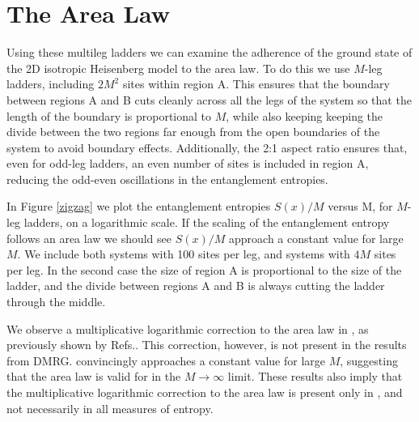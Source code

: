 \section{The Area Law}

Using these multileg ladders we can examine the adherence of the ground state of the 2D isotropic Heisenberg model to the area law.
To do this we use $M$-leg ladders, including $2M^2$ sites within region A.  
This ensures that the boundary between regions A and B cuts cleanly across all the legs of the system so that the length of the boundary is proportional to $M$, while also keeping keeping the divide between the two regions far enough from the open boundaries of the system to avoid boundary effects.
Additionally, the 2:1 aspect ratio ensures that, even for odd-leg ladders, an even number of sites is included in region A, reducing the odd-even oscillations in the entanglement entropies.

In Figure \ref{zigzag} we plot the entanglement entropies $S(x)/M$ versus M, for $M$-leg ladders,  on a logarithmic scale.
If the scaling of the entanglement entropy follows an area law we should see $S(x)/M$ approach a constant value for large $M$.
We include both systems with 100 sites per leg, and systems with $4M$ sites per leg. 
In the second case the size of region A is proportional to the size of the ladder, and the divide between regions A and B is always cutting the ladder through the middle.

We observe a multiplicative logarithmic correction to the area law in \vB, as previously shown by Refs.\cite{Alet,Chh}.
This correction, however, is not present in the \vn results from DMRG.
\vn convincingly approaches a constant value for large $M$, suggesting that the area law is valid for \vn in the $M \rightarrow \infty$ limit. 
These results also imply that the multiplicative logarithmic correction to the area law is present only in \vB, and not necessarily in all measures of entropy.


